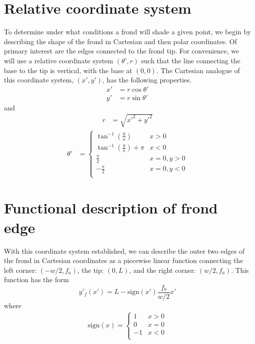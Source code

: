 \documentclass[10pt]{article}
\newcommand{\sign}{\mbox{sign}}
\begin{document}
\begin{multicols}{2}
\section{Relative coordinate system}
\label{sec:rel_coords}
To determine under what conditions a frond will shade a given point, we begin by describing the shape of the frond in Cartesian and then polar coordinates.
Of primary interest are the edges connected to the frond tip.
For convenience, we will use a relative coordinate system $(\theta',r)$ such that the line connecting the base to the tip is vertical, with the base at $(0,0)$.
The Cartesian analogue of this coordinate system, $(x',y')$, has the following properties.
\begin{align}
	x' &= r\cos\theta' \\ 
	y' &= r\sin\theta'
\end{align}
and
\begin{align}
	r &= \sqrt{x'^2+y'^2}
\end{align}
\vspace{-1em}
\begin{align}
	\theta' &= 
	\begin{cases}
		\tan^{-1}\left( \frac{y}{x} \right) & x > 0 \\
		\tan^{-1}\left( \frac{y}{x} \right) + \pi & x < 0 \\
		\frac{\pi}{2} & x = 0, y > 0 \\
		-\frac{\pi}{2} & x = 0, y < 0 \\
	\end{cases}
\end{align}

\section{Functional description of frond edge}
With this coordinate system established, we can describe the outer two edges of the frond in Cartesian coordinates as a piecewise linear function connecting the left corner: $(-w/2,f_a)$, the tip: $(0,L)$, and the right corner: $(w/2,f_a)$.
This function has the form
\begin{equation}
	y'_f(x') = L-\sign(x')\frac{f_b}{w/2}x'
\end{equation}
where
\begin{align}
	\sign(x) = 
	\begin{cases}
		1 & x > 0 \\
		0 & x = 0 \\
		-1 & x < 0 \\
	\end{cases}
\end{align}


\end{multicols}
\end{document}
